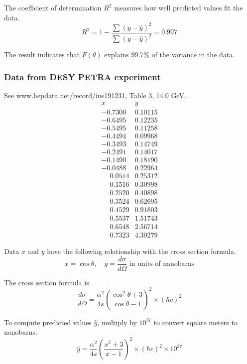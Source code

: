 The coefficient of determination $R^2$ measures how well predicted values fit the data.
\begin{equation*}
R^2=1-\frac{\sum(y-\hat{y})^2}{\sum(y-\bar{y})^2}=0.997
\end{equation*}

The result indicates that $F(\theta)$ explains
99.7\% of the variance in the data.

\subsubsection*{Data from DESY PETRA experiment}
See www.hepdata.net/record/ins191231, Table 3, 14.0 GeV.
\begin{equation*}
\begin{matrix}
x & y\\
-0.7300 & 0.10115\\
-0.6495 & 0.12235\\
-0.5495 & 0.11258\\
-0.4494 & 0.09968\\
-0.3493 & 0.14749\\
-0.2491 & 0.14017\\
-0.1490 & 0.18190\\
-0.0488 & 0.22964\\
\phantom+0.0514 & 0.25312\\
\phantom+0.1516 & 0.30998\\
\phantom+0.2520 & 0.40898\\
\phantom+0.3524 & 0.62695\\
\phantom+0.4529 & 0.91803\\
\phantom+0.5537 & 1.51743\\
\phantom+0.6548 & 2.56714\\
\phantom+0.7323 & 4.30279
\end{matrix}
\end{equation*}

Data $x$ and $y$ have the following relationship with the cross section formula.
\begin{equation*}
x=\cos\theta,
\quad
y=\frac{d\sigma}{d\Omega}\text{ in units of nanobarns}
\end{equation*}

The cross section formula is
\begin{equation*}
\frac{d\sigma}{d\Omega}
=\frac{\alpha^2}{4s}
\left(\frac{\cos^2\theta+3}{\cos\theta-1}\right)^2\times(\hbar c)^2
\end{equation*}

To compute predicted values $\hat{y}$, multiply by $10^{37}$ to convert square meters to nanobarns.
\begin{equation*}
\hat{y}
=\frac{\alpha^2}{4s}
\left(\frac{x^2+3}{x-1}\right)^2
\times(\hbar c)^2
\times10^{37}
\end{equation*}

